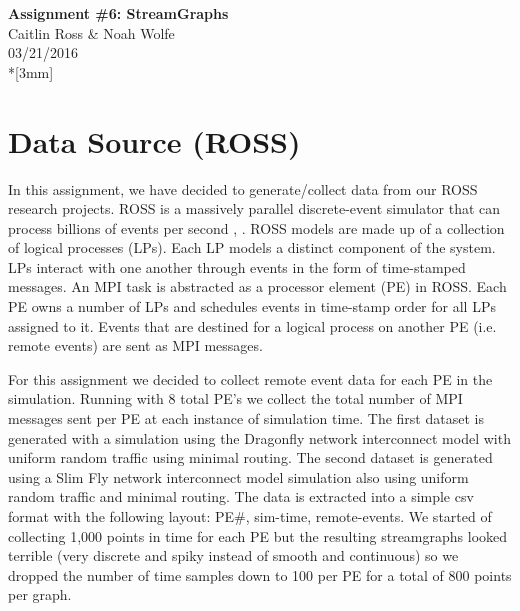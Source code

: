 \documentclass[12pt]{article}
\begin{document}
\thispagestyle{empty}
\begin{center}
{\Large\bf Assignment \#6: StreamGraphs}
\vspace{3mm}
\\Caitlin Ross \& Noah Wolfe
\\03/21/2016
\\*[3mm]
\end{center}
\section{Data Source (ROSS)}
In this assignment, we have decided to generate/collect data from our ROSS research projects. 
ROSS is a massively parallel discrete-event simulator that
can process billions of events per second \cite{Holder}, \cite{Bauer}. ROSS
models are made up of a collection of logical processes (LPs).
Each LP models a distinct component of the system. LPs
interact with one another through events in the form of time-stamped messages. An MPI task is abstracted as a processor
element (PE) in ROSS. Each PE owns a number of LPs and
schedules events in time-stamp order for all LPs assigned to
it. Events that are destined for a logical process on another
PE (i.e. remote events) are sent as MPI messages. 

For this assignment we decided to collect remote event data for each PE in the simulation. Running with 8 total PE's we collect the total number of MPI messages sent per PE at each instance of simulation time. The first dataset is generated with a simulation using the Dragonfly network interconnect model with uniform random traffic using minimal routing. The second dataset is generated using a Slim Fly network interconnect model simulation also using uniform random traffic and minimal routing. The data is extracted into a simple csv format with the following layout: PE\#, sim-time, remote-events. We started of collecting 1,000 points in time for each PE but the resulting streamgraphs looked terrible (very discrete and spiky instead of smooth and continuous) so we dropped the number of time samples down to 100 per PE for a total of 800 points per graph.
\end{document}
